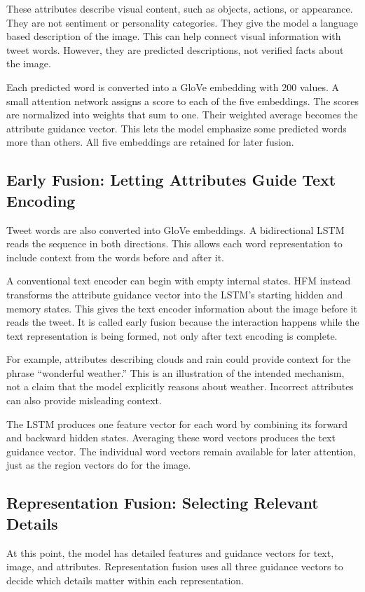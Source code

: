 \documentclass[conference]{IEEEtran}
\begin{document}
These attributes describe visual content, such as objects, actions, or appearance. They are not sentiment or personality categories. They give the model a language based description of the image. This can help connect visual information with tweet words. However, they are predicted descriptions, not verified facts about the image.

Each predicted word is converted into a GloVe embedding with 200 values. A small attention network assigns a score to each of the five embeddings. The scores are normalized into weights that sum to one. Their weighted average becomes the attribute guidance vector. This lets the model emphasize some predicted words more than others. All five embeddings are retained for later fusion.

\subsection{Early Fusion: Letting Attributes Guide Text Encoding}
Tweet words are also converted into GloVe embeddings. A bidirectional LSTM reads the sequence in both directions. This allows each word representation to include context from the words before and after it.

A conventional text encoder can begin with empty internal states. HFM instead transforms the attribute guidance vector into the LSTM's starting hidden and memory states. This gives the text encoder information about the image before it reads the tweet. It is called early fusion because the interaction happens while the text representation is being formed, not only after text encoding is complete.

For example, attributes describing clouds and rain could provide context for the phrase ``wonderful weather.'' This is an illustration of the intended mechanism, not a claim that the model explicitly reasons about weather. Incorrect attributes can also provide misleading context.

The LSTM produces one feature vector for each word by combining its forward and backward hidden states. Averaging these word vectors produces the text guidance vector. The individual word vectors remain available for later attention, just as the region vectors do for the image.

\subsection{Representation Fusion: Selecting Relevant Details}
At this point, the model has detailed features and guidance vectors for text, image, and attributes. Representation fusion uses all three guidance vectors to decide which details matter within each representation.
\end{document}
